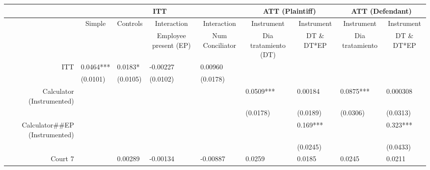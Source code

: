 \begin{tabular}{rrrrrrrrr}
\toprule
      & \multicolumn{4}{c}{ITT}       & \multicolumn{2}{c}{ATT (Plaintiff)} & \multicolumn{2}{c}{ATT (Defendant)} \\
\midrule
      & \multicolumn{1}{c}{Simple} & \multicolumn{1}{c}{Controls} & \multicolumn{1}{c}{Interaction} & \multicolumn{1}{c}{Interaction} & \multicolumn{1}{c}{Instrument} & \multicolumn{1}{c}{Instrument} & \multicolumn{1}{c}{Instrument} & \multicolumn{1}{c}{Instrument} \\
      \midrule
      & \multicolumn{1}{c}{} & \multicolumn{1}{c}{} & \multicolumn{1}{c}{Employee present (EP)} & \multicolumn{1}{c}{Num Conciliator} & \multicolumn{1}{c}{Dia tratamiento (DT)} & \multicolumn{1}{c}{DT \& DT*EP} & \multicolumn{1}{c}{Dia tratamiento} & \multicolumn{1}{c}{DT \& DT*EP} \\
      \midrule
      \midrule
ITT   & \multicolumn{1}{l}{0.0464***} & \multicolumn{1}{l}{0.0183*} & \multicolumn{1}{l}{-0.00227} & \multicolumn{1}{l}{0.00960} & \multicolumn{1}{l}{} & \multicolumn{1}{l}{} & \multicolumn{1}{l}{} & \multicolumn{1}{l}{} \\
      & \multicolumn{1}{l}{(0.0101)} & \multicolumn{1}{l}{(0.0105)} & \multicolumn{1}{l}{(0.0102)} & \multicolumn{1}{l}{(0.0178)} & \multicolumn{1}{l}{} & \multicolumn{1}{l}{} & \multicolumn{1}{l}{} & \multicolumn{1}{l}{} \\
Calculator (Instrumented) & \multicolumn{1}{l}{} & \multicolumn{1}{l}{} & \multicolumn{1}{l}{} & \multicolumn{1}{l}{} & \multicolumn{1}{l}{0.0509***} & \multicolumn{1}{l}{0.00184} & \multicolumn{1}{l}{0.0875***} & \multicolumn{1}{l}{0.000308} \\
      & \multicolumn{1}{l}{} & \multicolumn{1}{l}{} & \multicolumn{1}{l}{} & \multicolumn{1}{l}{} & \multicolumn{1}{l}{(0.0178)} & \multicolumn{1}{l}{(0.0189)} & \multicolumn{1}{l}{(0.0306)} & \multicolumn{1}{l}{(0.0313)} \\
Calculator\#\#EP (Instrumented) & \multicolumn{1}{l}{} & \multicolumn{1}{l}{} & \multicolumn{1}{l}{} & \multicolumn{1}{l}{} & \multicolumn{1}{l}{} & \multicolumn{1}{l}{0.169***} & \multicolumn{1}{l}{} & \multicolumn{1}{l}{0.323***} \\
      & \multicolumn{1}{l}{} & \multicolumn{1}{l}{} & \multicolumn{1}{l}{} & \multicolumn{1}{l}{} & \multicolumn{1}{l}{} & \multicolumn{1}{l}{(0.0245)} & \multicolumn{1}{l}{} & \multicolumn{1}{l}{(0.0433)} \\
Court 7 & \multicolumn{1}{l}{} & \multicolumn{1}{l}{0.00289} & \multicolumn{1}{l}{-0.00134} & \multicolumn{1}{l}{-0.00887} & \multicolumn{1}{l}{0.0259} & \multicolumn{1}{l}{0.0185} & \multicolumn{1}{l}{0.0245} & \multicolumn{1}{l}{0.0211} \\

\end{tabular}
